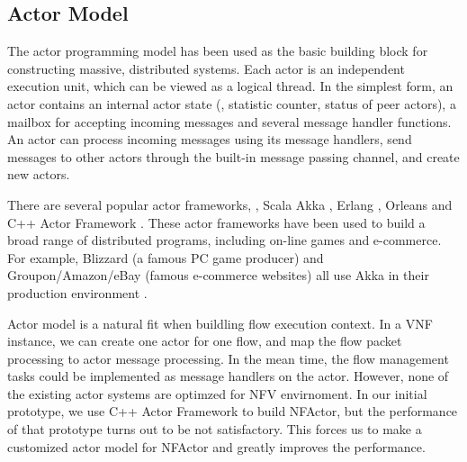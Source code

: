 \subsection{Actor Model}

The actor programming model has been used as the basic building block for constructing massive, distributed systems\cite{actor-wiki, akka, newell2016optimizing}. Each actor is an independent execution unit, which can be viewed as a logical thread. In the simplest form, an actor contains an internal actor state (\eg, statistic counter, status of peer actors), a mailbox for accepting incoming messages and several message handler functions. An actor can process incoming messages using its message handlers, send messages to other actors through the built-in message passing channel, and create new actors.

There are several popular actor frameworks, \ie, Scala Akka \cite{akka}, Erlang \cite{erlang}, Orleans \cite{Orleans} and C++ Actor Framework \cite{caf}. These actor frameworks have been used to build a broad range of distributed programs, including on-line games and e-commerce. For example, Blizzard (a famous PC game producer) and Groupon/Amazon/eBay (famous e-commerce websites) all use Akka in their production environment \cite{akka}.


Actor model is a natural fit when buildling flow execution context. In a VNF instance, we can create one actor for one flow, and map the flow packet processing to actor message processing. In the mean time, the flow management tasks could be implemented as message handlers on the actor. However, none of the existing actor systems are optimzed for NFV envirnoment. In our initial prototype, we use C++ Actor Framework \cite{caf} to build NFActor, but the performance of that prototype turns out to be not satisfactory. This forces us to make a customized actor model for NFActor and greatly improves the performance. 

